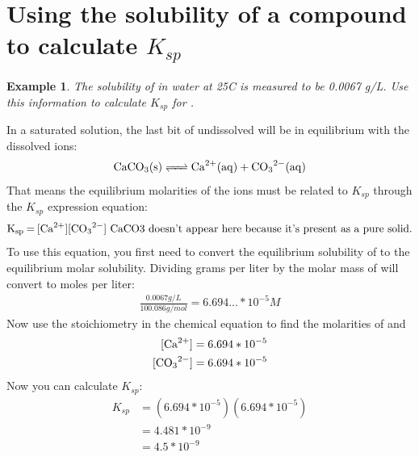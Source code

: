 \documentclass{article}  %
\newtheorem{exmp}{Example}
\begin{document}
\section*{Using the solubility of a compound to calculate $K_{sp}$}
\begin{exmp}
    The solubility of  in water at 25C is measured to be 0.0067 g/L. Use this information to calculate $K_{sp}$ for .
\end{exmp}
In a saturated solution, the last bit of undissolved  will be in equilibrium with the dissolved ions:
\begin{equation*}
    \begin{aligned}
        \ce{CaCO3(s) <=> Ca^2+(aq) + CO3^2-(aq)}
    \end{aligned}
\end{equation*}
That means the equilibrium molarities of the ions must be related to $K_{sp}$ through the $K_{sp}$ expression equation:
\begin{equation*}
    \begin{aligned}
        \ce{K_{sp} = [Ca^2+][CO3^2-]} \text{ CaCO3 doesn't appear here because it's present as a pure solid.}
    \end{aligned}
\end{equation*}
To use this equation, you first need to convert the equilibrium solubility of  to the equilibrium molar solubility. Dividing grams per liter by the molar mass of  will convert to moles per liter:
\begin{equation*}
    \begin{aligned}
        \frac{0.0067 g/L}{100.086 g/mol} = 6.694...*10^{-5}M
    \end{aligned}
\end{equation*}
Now use the stoichiometry in the chemical equation to find the molarities of  and 
\begin{equation*}
    \begin{aligned}
        \ce{[Ca^2+]} = 6.694*10^{-5}\\
        \ce{[CO3^2-]} = 6.694*10^{-5}
    \end{aligned}
\end{equation*}
Now you can calculate $K_{sp}$: 
\begin{equation*}
    \begin{aligned}
        K_{sp} &= (6.694*10^{-5})(6.694*10^{-5})\\
            &= 4.481*10^{-9} \\
            &= 4.5*10^{-9}
    \end{aligned}
\end{equation*}
\end{document}
